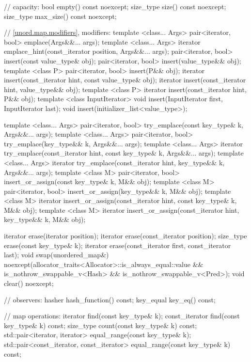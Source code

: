\begin{codeblock}
{{    // capacity:
    bool      empty() const noexcept;
    size_type size() const noexcept;
    size_type max_size() const noexcept;

    // \ref{unord.map.modifiers}, modifiers:
    template <class... Args> pair<iterator, bool> emplace(Args&&... args);
    template <class... Args> iterator emplace_hint(const_iterator position, Args&&... args);
    pair<iterator, bool> insert(const value_type& obj);
    pair<iterator, bool> insert(value_type&& obj);
    template <class P> pair<iterator, bool> insert(P&& obj);
    iterator       insert(const_iterator hint, const value_type& obj);
    iterator       insert(const_iterator hint, value_type&& obj);
    template <class P> iterator insert(const_iterator hint, P&& obj);
    template <class InputIterator> void insert(InputIterator first, InputIterator last);
    void insert(initializer_list<value_type>);

    template <class... Args>
      pair<iterator, bool> try_emplace(const key_type& k, Args&&... args);
    template <class... Args>
      pair<iterator, bool> try_emplace(key_type&& k, Args&&... args);
    template <class... Args>
      iterator try_emplace(const_iterator hint, const key_type& k, Args&&... args);
    template <class... Args>
      iterator try_emplace(const_iterator hint, key_type&& k, Args&&... args);
    template <class M>
      pair<iterator, bool> insert_or_assign(const key_type& k, M&& obj);
    template <class M>
      pair<iterator, bool> insert_or_assign(key_type&& k, M&& obj);
    template <class M>
      iterator insert_or_assign(const_iterator hint, const key_type& k, M&& obj);
    template <class M>
      iterator insert_or_assign(const_iterator hint, key_type&& k, M&& obj);

    iterator  erase(iterator position);
    iterator  erase(const_iterator position);
    size_type erase(const key_type& k);
    iterator  erase(const_iterator first, const_iterator last);
    void      swap(unordered_map&)
      noexcept(allocator_traits<Allocator>::is_always_equal::value &&
               is_nothrow_swappable_v<Hash> &&
               is_nothrow_swappable_v<Pred>);
    void      clear() noexcept;

    // observers:
    hasher hash_function() const;
    key_equal key_eq() const;

    // map operations:
    iterator       find(const key_type& k);
    const_iterator find(const key_type& k) const;
    size_type      count(const key_type& k) const;
    std::pair<iterator, iterator>             equal_range(const key_type& k);
    std::pair<const_iterator, const_iterator> equal_range(const key_type& k) const;

}}
\end{codeblock}
